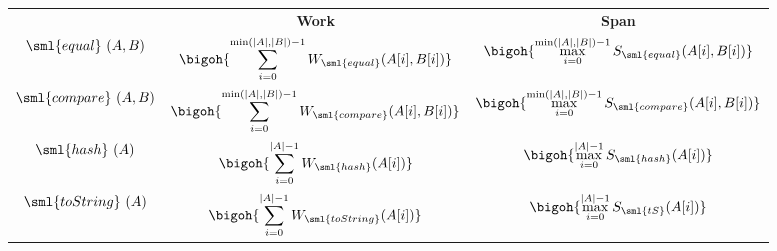 \begin{cluster}
\label{grp:cost:sequence}

\begin{costspec}[MkSeqElt]
\label{cost:sequence}
\begin{tabular}{c|c|c}
& \textbf{Work} & \textbf{Span} \\
$\sml{equal}~(A,B)$ & $\displaystyle \bigoh{\sum_{i=0}^{\min(|A|, |B|) - 1} W_{\sml{equal}}(A[i], B[i])}$ & $\displaystyle \bigoh {\max_{i=0}^{\min(|A|, |B|) - 1} S_{\sml{equal}} (A[i], B[i])}$ \\
$\sml{compare}~(A,B)$ & $\displaystyle \bigoh{\sum_{i=0}^{\min(|A|, |B|) - 1} W_{\sml{compare}}(A[i], B[i])}$ & $\displaystyle \bigoh {\max_{i=0}^{\min(|A|, |B|) - 1} S_{\sml{compare}} (A[i], B[i])}$ \\
$\sml{hash}~(A)$ & $\displaystyle \bigoh{\sum_{i=0}^{|A| - 1} W_{\sml{hash}}(A[i])}$ & $\displaystyle \bigoh {\max_{i=0}^{|A| - 1} S_{\sml{hash}} (A[i])}$ \\
$\sml{toString}~(A)$ & $\displaystyle \bigoh{\sum_{i=0}^{|A| - 1} W_{\sml{toString}}(A[i])}$ & $\displaystyle \bigoh {\max_{i=0}^{|A| - 1} S_{\sml{tS}} (A[i])}$ \\
\end{tabular}

\end{costspec}
\end{cluster}

